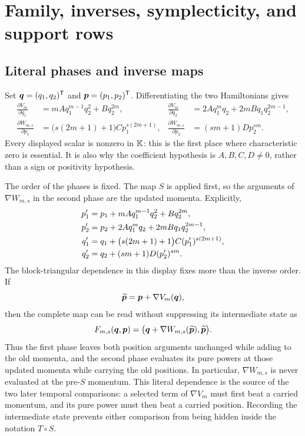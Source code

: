 \documentclass[11pt]{article}
\theoremstyle{definition}
\theoremstyle{remark}
\begin{document}
\section{Family, inverses, symplecticity, and support rows}
\label{sec:family}

\subsection{Literal phases and inverse maps}

Set \(\boldsymbol{q}=(q_1,q_2)^{\mathsf{T}}\) and
\(\boldsymbol{p}=(p_1,p_2)^{\mathsf{T}}\).  Differentiating the two Hamiltonians gives
\begin{align}
\frac{\partial V_m}{\partial q_1}
&=mAq_1^{m-1}q_2^2+Bq_2^{2m},
&
\frac{\partial V_m}{\partial q_2}
&=2Aq_1^mq_2+2mBq_1q_2^{2m-1},
\label{eq:grad-v}\\
\frac{\partial W_{m,s}}{\partial p_1}
&=\bigl(s(2m+1)+1\bigr)C p_1^{s(2m+1)},
&
\frac{\partial W_{m,s}}{\partial p_2}
&=(sm+1)D p_2^{sm}.
\label{eq:grad-w}
\end{align}
Every displayed scalar is nonzero in \(\mathbb{K}\): this is the first place where
characteristic zero is essential.  It is also why the coefficient hypothesis
is \(A,B,C,D\neq0\), rather than a sign or positivity hypothesis.

The order of the phases is fixed.  The map \(S\) is applied first, so the
arguments of \(\nabla W_{m,s}\) in the second phase are the updated momenta.
Explicitly,
\begin{align}
p_1'&=p_1+mAq_1^{m-1}q_2^2+Bq_2^{2m},\notag\\
p_2'&=p_2+2Aq_1^mq_2+2mBq_1q_2^{2m-1},\notag\\
q_1'&=q_1+\bigl(s(2m+1)+1\bigr)C(p_1')^{s(2m+1)},\notag\\
q_2'&=q_2+(sm+1)D(p_2')^{sm}.
\label{eq:complete-coordinate-map}
\end{align}
The block-triangular dependence in this display fixes more than the inverse
order.  If
\[
\widetilde{\boldsymbol{p}}=\boldsymbol{p}+\nabla V_m(\boldsymbol{q}),
\]
then the complete map can be read without suppressing its intermediate
state as
\begin{equation}
F_{m,s}(\boldsymbol{q},\boldsymbol{p})
=\bigl(\boldsymbol{q}+\nabla W_{m,s}(\widetilde{\boldsymbol{p}}),
       \widetilde{\boldsymbol{p}}\bigr).
\label{eq:intermediate-state}
\end{equation}
Thus the first phase leaves both position arguments unchanged while adding
to the old momenta, and the second phase evaluates its pure powers at those
updated momenta while carrying the old positions.  In particular,
\(\nabla W_{m,s}\) is never evaluated at the pre-\(S\) momentum.  This
literal dependence is the source of the two later temporal comparisons: a
selected term of \(\nabla V_m\) must first beat a carried momentum, and its
pure power must then beat a carried position.  Recording the intermediate
state prevents either comparison from being hidden inside the notation
\(T\circ S\).
\end{document}
